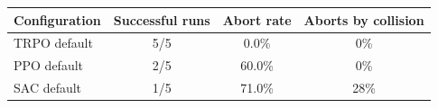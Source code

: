 \begin{tabular}{lccc}
\toprule
Configuration & Successful runs & Abort rate & Aborts by collision \\
\midrule
TRPO default & 5/5 & 0.0\% & 0\% \\
PPO default & 2/5 & 60.0\% & 0\% \\
SAC default & 1/5 & 71.0\% & 28\% \\
\bottomrule
\end{tabular}
